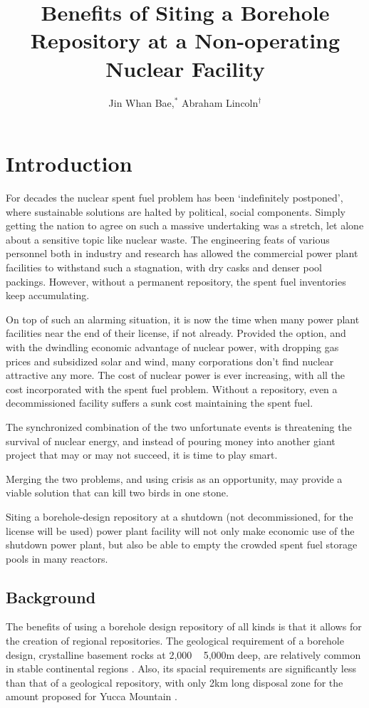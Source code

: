 \documentclass{anstrans}
\title{Benefits of Siting a Borehole Repository at a Non-operating Nuclear 
Facility}
\author{Jin Whan Bae,$^{*}$ Abraham Lincoln$^{\dagger}$}
\institute{
$^{*}$Dept. of Nuclear Plasma, and Radiological Engineering, University of Illinois at Urbana-Champaign, Urbana, IL
\and
$^{\dagger}$State Capitol Building, Springfield, IL
}
\begin{document}
\section{Introduction}

For decades the nuclear spent fuel problem has been `indefinitely postponed', 
where sustainable solutions are halted by political, social components. Simply 
getting the nation to agree on such a massive undertaking was a stretch, let 
alone about a sensitive topic like nuclear waste. The engineering feats of 
various personnel both in industry and research has allowed the commercial 
power plant facilities to withstand such a stagnation, with dry casks and 
denser pool packings. However, without a permanent repository, the spent fuel 
inventories keep accumulating.

On top of such an alarming situation, it is now the time when many power plant 
facilities near the end of their license, if not already. Provided the option, 
and with the dwindling economic advantage of nuclear power, with dropping gas 
prices and subsidized solar and wind, many corporations don't find nuclear 
attractive any more. The cost of nuclear power is ever increasing, with all the 
cost incorporated with the spent fuel problem. Without a repository, even a 
decommissioned facility suffers a sunk cost maintaining the spent fuel.

The synchronized combination of the two unfortunate events is threatening the 
survival of nuclear energy, and instead of pouring money into another giant 
project that may or may not succeed, it is time to play smart.

Merging the two problems, and using crisis as an opportunity, may provide a 
viable solution that can kill two birds in one stone.

Siting a borehole-design repository at a shutdown (not decommissioned, for the 
license will be used) power plant facility will not only make economic use of 
the shutdown power plant, but also be able to empty the crowded spent fuel 
storage pools in many reactors.


\subsection{Background}

The benefits of using a borehole design repository of all kinds is that it 
allows for the creation of regional repositories. The geological requirement of 
a borehole design, crystalline basement rocks at 2,000 ~ 5,000m deep, are 
relatively common in stable continental regions \cite{arnold_research_2012}.  
Also, its spacial requirements are significantly less than that of a geological 
repository, with only 2km long disposal zone for the amount proposed for Yucca 
Mountain \cite{brady_deep_2009}.
\end{document}
